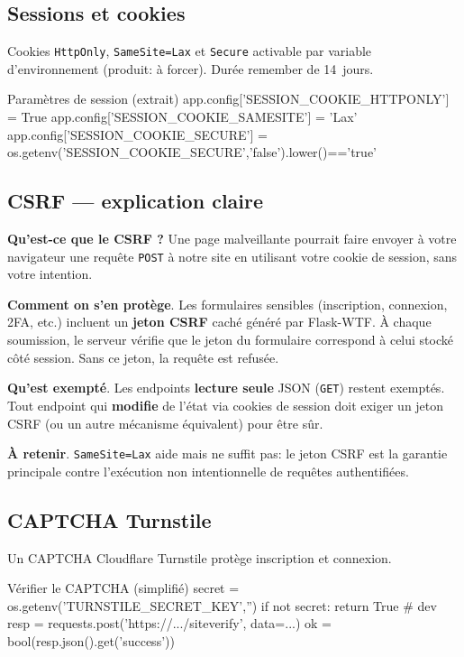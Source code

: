\subsection*{Sessions et cookies}
\noindent Cookies \texttt{HttpOnly}, \texttt{SameSite=Lax} et \texttt{Secure} activable par variable d'environnement (produit: à forcer). Durée \og remember \fg{} de 14~jours.
\begin{codebox}[language=Python]{Paramètres de session (extrait)}
app.config['SESSION_COOKIE_HTTPONLY'] = True
app.config['SESSION_COOKIE_SAMESITE'] = 'Lax'
app.config['SESSION_COOKIE_SECURE'] = os.getenv('SESSION_COOKIE_SECURE','false').lower()=='true'
\end{codebox}

\subsection*{CSRF — explication claire}
\noindent \textbf{Qu'est-ce que le CSRF ?} Une page malveillante pourrait faire envoyer à votre navigateur une requête \texttt{POST} à notre site en utilisant votre cookie de session, sans votre intention.

\noindent \textbf{Comment on s'en protège}. Les formulaires sensibles (inscription, connexion, 2FA, etc.) incluent un \textbf{jeton CSRF} caché généré par Flask-WTF. À chaque soumission, le serveur vérifie que le jeton du formulaire correspond à celui stocké côté session. Sans ce jeton, la requête est refusée.

\noindent \textbf{Qu'est exempté}. Les endpoints \textbf{lecture seule} JSON (\texttt{GET}) restent exemptés. Tout endpoint qui \textbf{modifie} de l'état via cookies de session doit exiger un jeton CSRF (ou un autre mécanisme équivalent) pour être sûr.

\noindent \textbf{À retenir}. \texttt{SameSite=Lax} aide mais ne suffit pas: le jeton CSRF est la garantie principale contre l'exécution non intentionnelle de requêtes authentifiées.

\subsection*{CAPTCHA Turnstile}
\noindent Un CAPTCHA Cloudflare Turnstile protège inscription et connexion.
\begin{codebox}[language=Python]{Vérifier le CAPTCHA (simplifié)}
secret = os.getenv('TURNSTILE_SECRET_KEY','')
if not secret: return True  # dev
resp = requests.post('https://.../siteverify', data={...})
ok = bool(resp.json().get('success'))
\end{codebox}

